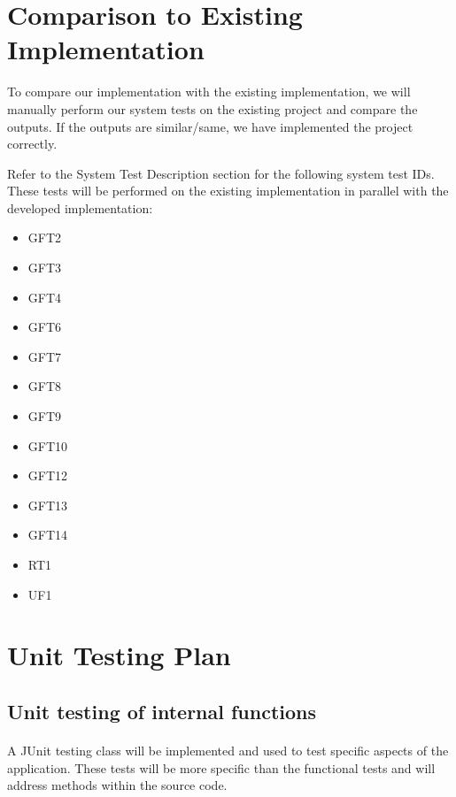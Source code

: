 \documentclass[12pt, titlepage]{article}
\begin{document}
\section{Comparison to Existing Implementation}	

To compare our implementation with the existing implementation, we will manually perform our system tests on the existing project and compare the outputs. If the outputs are similar/same, we have implemented the project correctly. 

Refer to the System Test Description section for the following system test IDs.
These tests will be performed on the existing implementation in parallel with the developed implementation:

\begin{itemize}

\item{}
GFT2
\item{}
GFT3
\item{}
GFT4
\item{}
GFT6
\item{}
GFT7
\item{}
GFT8
\item{}
GFT9
\item{}
GFT10
\item{}
GFT12
\item{}
GFT13
\item{}
GFT14
\item{}
RT1
\item{}
UF1

\end{itemize}
				
\section{Unit Testing Plan}
		
\subsection{Unit testing of internal functions}

\paragraph{}
A JUnit testing class will be implemented and used to test specific aspects of the application. These tests will be more specific than the functional tests and will address methods within the source code.
\end{document}
